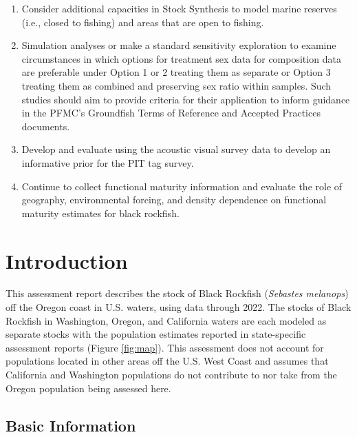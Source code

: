 \documentclass[11pt,
  letterpaper,
]{article}
\begin{document}
\begin{enumerate}
\item
  Consider additional capacities in Stock Synthesis to model marine reserves (i.e., closed to fishing) and areas that are open to fishing.
\item
  Simulation analyses or make a standard sensitivity exploration to examine circumstances in which options for treatment sex data for composition data are preferable under Option 1 or 2 treating them as separate or Option 3 treating them as combined and preserving sex ratio within samples. Such studies should aim to provide criteria for their application to inform guidance in the PFMC's Groundfish Terms of Reference and Accepted Practices documents.
\item
  Develop and evaluate using the acoustic visual survey data to develop an informative prior for the PIT tag survey.
\item
  Continue to collect functional maturity information and evaluate the role of geography, environmental forcing, and density dependence on functional maturity estimates for black rockfish.
\end{enumerate}

\vspace{500cm}

\pagebreak
\setlength{\parskip}{5mm plus1mm minus1mm}
\setcounter{page}{1}
\renewcommand{\thefigure}{\arabic{figure}}
\renewcommand{\thetable}{\arabic{table}}
\setcounter{table}{0}
\setcounter{figure}{0}

\hypertarget{introduction}{%
\section{Introduction}\label{introduction}}

This assessment report describes the stock of Black Rockfish (\emph{Sebastes melanops}) off the Oregon coast in U.S. waters, using data through 2022. The stocks of Black Rockfish in Washington, Oregon, and California waters are each modeled as separate stocks with the population estimates reported in state-specific assessment reports (Figure \ref{fig:map}). This assessment does not account for populations located in other areas off the U.S. West Coast and assumes that California and Washington populations do not contribute to nor take from the Oregon population being assessed here.

\hypertarget{basic-information}{%
\subsection{Basic Information}\label{basic-information}}
\end{document}
